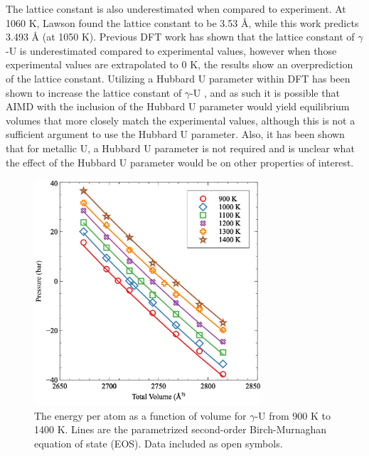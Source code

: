 \documentclass[review]{elsarticle}
\begin{document}
The lattice constant is also underestimated when compared to experiment. At 1060 K, Lawson \cite{lawson1988} found the lattice constant to be 3.53 {\AA}, while this work predicts 3.493 {\AA} (at 1050 K). Previous DFT work has shown that the lattice constant of $\gamma$-U is underestimated compared to experimental values, however when those experimental values are extrapolated to 0 K, the results show an overprediction of the lattice constant\cite{beeler2010, xie2013}. Utilizing a Hubbard U parameter within DFT has been shown to increase the lattice constant of $\gamma$-U \cite{xie2013}, and as such it is possible that AIMD with the inclusion of the Hubbard U parameter would yield equilibrium volumes that more closely match the experimental values, although this is not a sufficient argument to use the Hubbard U parameter. Also, it has been shown that for metallic U, a Hubbard U parameter is not required \cite{wirth2012, wirth2011, beeler2010, taylor2008, beeler2013} and is unclear what the effect of the Hubbard U parameter would be on other properties of interest. 

\begin{figure}[h]
 \centering
 \includegraphics[width=0.75\textwidth]{2_p_vs_v.png} 
 \caption{The energy per atom as a function of volume for $\gamma$-U from 900 K to 1400 K. Lines are the parametrized second-order Birch-Murnaghan equation of state (EOS). Data included as open symbols. }
 \label{fig:pvsv}
\end{figure}
\end{document}
